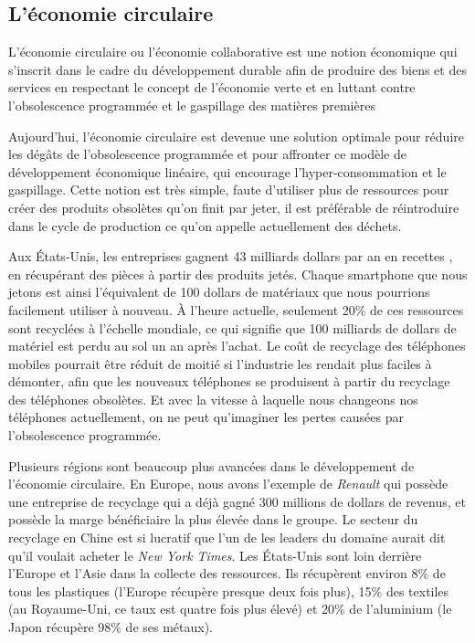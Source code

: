 \subsection{L'économie circulaire}


\bigbreak
L’économie circulaire ou l’économie collaborative est une notion économique qui s'inscrit dans le cadre du développement durable afin de produire des biens et des services en respectant le concept de l'économie verte et en luttant contre l'obsolescence programmée et le gaspillage des matières premières %


\bigbreak
Aujourd'hui, l'économie circulaire est devenue une solution optimale pour réduire les dégâts de l'obsolescence programmée et pour affronter ce modèle de développement économique linéaire, qui encourage l’hyper-consommation et le gaspillage. Cette notion est très simple, faute d'utiliser plus de ressources pour créer des produits obsolètes qu'on finit par jeter, il est préférable de réintroduire dans le cycle de production ce qu'on appelle actuellement des déchets.


\bigbreak
Aux États-Unis, les entreprises gagnent 43 milliards dollars par an en recettes \cite{usatoday}, en récupérant des pièces à partir des produits jetés. Chaque smartphone que nous jetons est ainsi l'équivalent de 100 dollars de matériaux que nous pourrions facilement utiliser à nouveau. À l'heure actuelle, seulement 20\% de ces ressources sont recyclées à l'échelle mondiale, ce qui signifie que 100 milliards de dollars de matériel est perdu au sol un an après l'achat. Le coût de recyclage des téléphones mobiles pourrait être réduit de moitié si l'industrie les rendait plus faciles à démonter, afin que les nouveaux téléphones se produisent à partir du recyclage des téléphones obsolètes. Et avec la vitesse à laquelle nous changeons nos téléphones actuellement, on ne peut qu'imaginer les pertes causées par l'obsolescence programmée.


\bigbreak
Plusieurs régions sont beaucoup plus avancées dans le développement de l'économie circulaire. En Europe, nous avons l'exemple de \textit{Renault} qui possède une entreprise de recyclage qui a déjà gagné 300 millions de dollars de revenus, et possède la marge bénéficiaire la plus élevée dans le groupe. Le secteur du recyclage en Chine est si lucratif que l'un de les leaders du domaine aurait dit qu'il voulait acheter le \textit{New York Times}. Les États-Unis sont loin derrière l'Europe et l'Asie dans la collecte des ressources. Ils récupèrent environ 8\% de tous les plastiques (l'Europe récupère presque deux fois plus), 15\% des textiles (au Royaume-Uni, ce taux est quatre fois plus élevé) et 20\% de l'aluminium (le Japon récupère 98\% de ses métaux).

